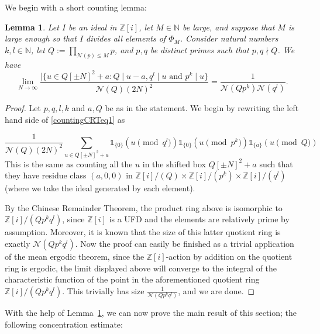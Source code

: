 \documentclass[11pt]{amsart}
\newtheorem{lemma}{Lemma}[section]
\theoremstyle{definition}
\newcommand{\N}{{\mathbb N}}
\newcommand{\NN}{{\mathcal N}}
\newcommand{\Z}{{\mathbb Z}}
\begin{document}
We begin with a short counting lemma:
\begin{lemma}\label{countingCRT}
Let $I$ be an ideal in $\Z[i]$, let $M \in \N$ be large, and suppose that $M$ is large enough so that $I$ divides all elements of $\Phi_{M}$. Consider natural numbers $k, l \in \N$, let $Q:=\prod_{\NN(p)\leq M} p$, and $p, q$ be distinct primes such that $p, q \nmid Q$. We have
\begin{equation}\label{countingCRTeq1}
\lim_{N\to \infty} \frac{| \{u \in Q[\pm N]^2+a : Q \mid u-a, q^l \mid u \text{ and } p^k \mid u\}}{\NN(Q)(2N)^2} = \frac{1}{\NN(Qp^k) \NN(q^l)}.
\end{equation}
\end{lemma}
\begin{proof}
Let $p, q, l, k$ and $a, Q$ be as in the statement. We begin by rewriting the left hand side of \eqref{countingCRTeq1} as 

\[
\frac{1}{\NN(Q)(2N)^2}\sum_{u \in Q[\pm N]^2+a} \mathds{1}_{\{0\}}(u \pmod{q^l}) \mathds{1}_{\{0\}
}(u \pmod{ p^k}) \mathds{1}_{\{a\}}(u \pmod Q)\]
This is the same as counting all the $u$ in the shifted box $Q[\pm N]^2+a$ such that they have residue class $(a,0,0)$ in $\Z[i]/(Q) \times \Z[i]/(p^k) \times \Z[i]/(q^l)$ (where we take the ideal generated by each element).

By the Chinese Remainder Theorem, the product ring above is isomorphic to $\Z[i]/(Qp^kq^l)$, since $\Z[i]$ is a UFD and the elements are relatively prime by assumption. Moreover, it is known that the size of this latter quotient ring is exactly $\NN(Qp^kq^l)$. Now the proof can easily be finished as a trivial application of the mean ergodic theorem, since the $\Z[i]$-action by addition on the quotient ring is ergodic, the limit displayed above will converge to the integral of the characteristic function of the point in the aforementioned quotient ring $\Z[i]/(Qp^kq^l)$. This trivially has size $\frac{1}{\NN(Qp^kq^l)}$, and we are done.
\end{proof}
With the help of Lemma~\ref{countingCRT}, we can now prove the main result of this section; the following concentration estimate:
\end{document}
